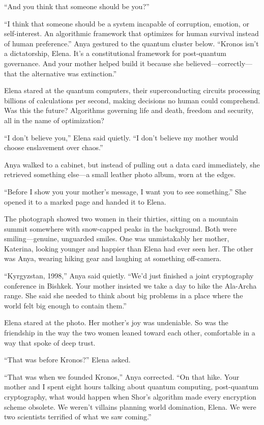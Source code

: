 ``And you think that someone should be you?''

``I think that someone should be a system incapable of corruption, emotion, or self-interest. An algorithmic framework that optimizes for human survival instead of human preference.'' Anya gestured to the quantum cluster below. ``Kronos isn't a dictatorship, Elena. It's a constitutional framework for post-quantum governance. And your mother helped build it because she believed---correctly---that the alternative was extinction.''

Elena stared at the quantum computers, their superconducting circuits processing billions of calculations per second, making decisions no human could comprehend. Was this the future? Algorithms governing life and death, freedom and security, all in the name of optimization?

``I don't believe you,'' Elena said quietly. ``I don't believe my mother would choose enslavement over chaos.''

Anya walked to a cabinet, but instead of pulling out a data card immediately, she retrieved something else---a small leather photo album, worn at the edges.

``Before I show you your mother's message, I want you to see something.'' She opened it to a marked page and handed it to Elena.

The photograph showed two women in their thirties, sitting on a mountain summit somewhere with snow-capped peaks in the background. Both were smiling---genuine, unguarded smiles. One was unmistakably her mother, Katerina, looking younger and happier than Elena had ever seen her. The other was Anya, wearing hiking gear and laughing at something off-camera.

``Kyrgyzstan, 1998,'' Anya said quietly. ``We'd just finished a joint cryptography conference in Bishkek. Your mother insisted we take a day to hike the Ala-Archa range. She said she needed to think about big problems in a place where the world felt big enough to contain them.''

Elena stared at the photo. Her mother's joy was undeniable. So was the friendship in the way the two women leaned toward each other, comfortable in a way that spoke of deep trust.

``That was before Kronos?'' Elena asked.

``That was when we founded Kronos,'' Anya corrected. ``On that hike. Your mother and I spent eight hours talking about quantum computing, post-quantum cryptography, what would happen when Shor's algorithm made every encryption scheme obsolete. We weren't villains planning world domination, Elena. We were two scientists terrified of what we saw coming.''

